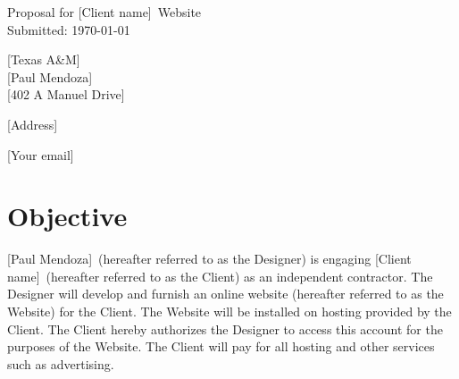 \documentclass[a4paper,12pt]{article} %
\newcommand{\YourName}{[Paul Mendoza]}
\newcommand{\CompanyName}{[Texas A&M]}
\newcommand{\AddressLineOne}{[402 A Manuel Drive]}
\newcommand{\AddressLineTwo}{[Address]}
\newcommand{\YourEmail}{[Your email]}
\newcommand{\ClientName}{[Client name]}
\begin{document}

\begin{titlepage}

\vspace*{\fill} %

\begin{center}

{\LARGE Proposal for \ClientName~Website}\\ [1.5cm]

Submitted: \today

\end{center}

\CompanyName\\

\YourName\\

\AddressLineOne

\AddressLineTwo

\YourEmail

\vspace*{\fill} %

\end{titlepage}


\section{Objective}

\YourName~(hereafter referred to as the Designer) is engaging \ClientName~(hereafter referred to as the Client) as an independent contractor. The Designer will develop and furnish an online website (hereafter referred to as the Website) for the Client. The Website will be installed on hosting provided by the Client. The Client hereby authorizes the Designer to access this account for the purposes of the Website. The Client will pay for all hosting and other services such as advertising.

\end{document}
